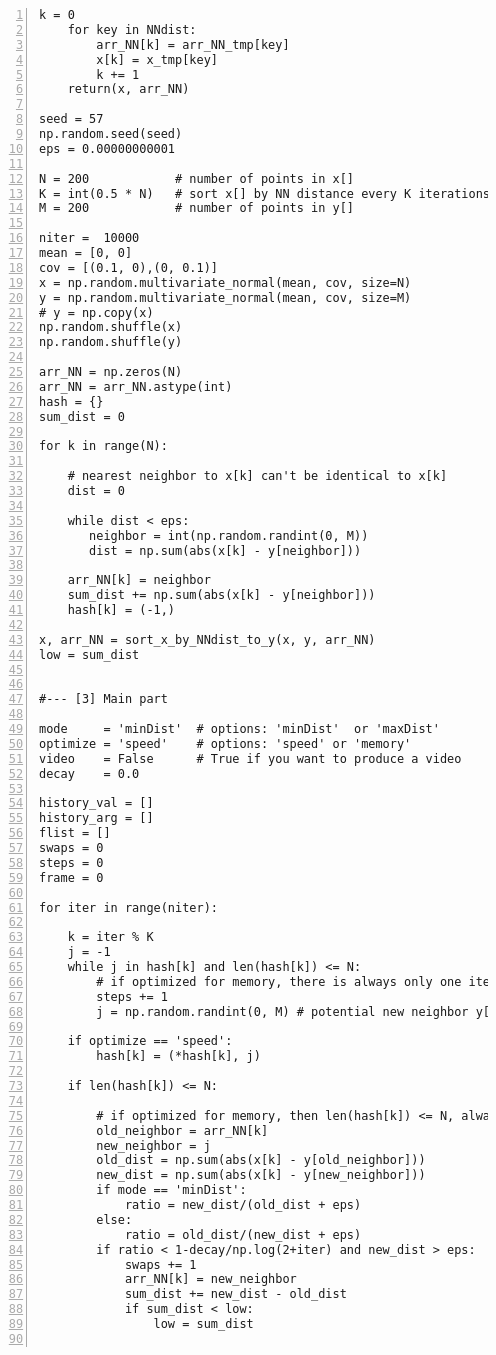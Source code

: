 \documentclass[oneside,10pt]{book}
\begin{document}
\begin{lstlisting}[numbers=left]
    k = 0
    for key in NNdist:
        arr_NN[k] = arr_NN_tmp[key]
        x[k] = x_tmp[key]
        k += 1
    return(x, arr_NN)

seed = 57
np.random.seed(seed)
eps = 0.00000000001

N = 200            # number of points in x[]
K = int(0.5 * N)   # sort x[] by NN distance every K iterations
M = 200            # number of points in y[]

niter =  10000 
mean = [0, 0]
cov = [(0.1, 0),(0, 0.1)]
x = np.random.multivariate_normal(mean, cov, size=N)
y = np.random.multivariate_normal(mean, cov, size=M)
# y = np.copy(x) 
np.random.shuffle(x)
np.random.shuffle(y)

arr_NN = np.zeros(N)
arr_NN = arr_NN.astype(int)
hash = {}
sum_dist = 0

for k in range(N):

    # nearest neighbor to x[k] can't be identical to x[k]
    dist = 0

    while dist < eps:
       neighbor = int(np.random.randint(0, M))
       dist = np.sum(abs(x[k] - y[neighbor]))

    arr_NN[k] = neighbor
    sum_dist += np.sum(abs(x[k] - y[neighbor]))
    hash[k] = (-1,)

x, arr_NN = sort_x_by_NNdist_to_y(x, y, arr_NN)
low = sum_dist


#--- [3] Main part

mode     = 'minDist'  # options: 'minDist'  or 'maxDist'
optimize = 'speed'    # options: 'speed' or 'memory'
video    = False      # True if you want to produce a video
decay    = 0.0

history_val = []
history_arg = []
flist = []
swaps = 0
steps = 0
frame = 0

for iter in range(niter):

    k = iter % K 
    j = -1
    while j in hash[k] and len(hash[k]) <= N: 
        # if optimized for memory, there is always only one iter in this loop
        steps += 1
        j = np.random.randint(0, M) # potential new neighbor y[j], to x[k]

    if optimize == 'speed':
        hash[k] = (*hash[k], j) 

    if len(hash[k]) <= N:

        # if optimized for memory, then len(hash[k]) <= N, always
        old_neighbor = arr_NN[k]
        new_neighbor = j
        old_dist = np.sum(abs(x[k] - y[old_neighbor]))
        new_dist = np.sum(abs(x[k] - y[new_neighbor]))
        if mode == 'minDist':
            ratio = new_dist/(old_dist + eps)
        else:
            ratio = old_dist/(new_dist + eps)
        if ratio < 1-decay/np.log(2+iter) and new_dist > eps: 
            swaps += 1
            arr_NN[k] = new_neighbor
            sum_dist += new_dist - old_dist
            if sum_dist < low:
                low = sum_dist


\end{lstlisting}
\end{document}
